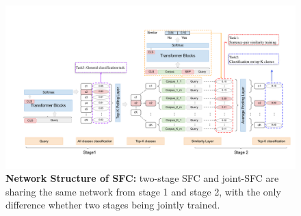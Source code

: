 \begin{figure}[t]
  \begin{centering}
    \includegraphics[scale=0.72]{picture/picture4} 
    \par
  \end{centering}
  \caption{
    \textbf{Network Structure of SFC:} two-stage SFC and joint-SFC are sharing
    the  same  network  from  stage  1  and  stage 2, with the only difference
    whether two stages being jointly trained.
  }
  \label{fig:framework}
\end{figure}

